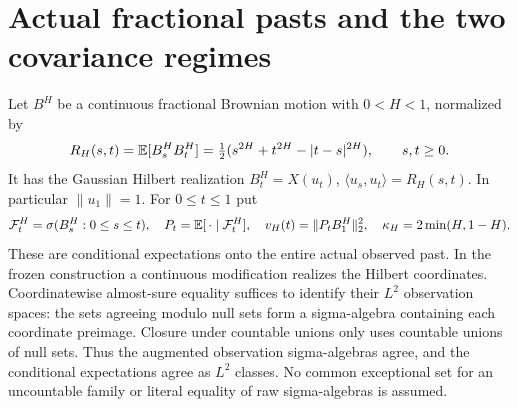 \documentclass[11pt]{article}
\begin{document}
\section{Actual fractional pasts and the two covariance regimes}
Let $B^H$ be a continuous fractional Brownian motion with $0<H<1$,
normalized by
\[
 R_H(s,t)=\mathbb E[B_s^HB_t^H]
 =\tfrac12(s^{2H}+t^{2H}-|t-s|^{2H}),\qquad s,t\geq0.
\]
It has the Gaussian Hilbert realization $B_t^H=X(u_t)$,
$\langle u_s,u_t\rangle=R_H(s,t)$. In particular $\|u_1\|=1$.
For $0\leq t\leq1$ put
\[
 \mathcal F_t^H=\sigma(B_s^H:0\leq s\leq t),\quad
 P_t=\mathbb E[\,\cdot\mid\mathcal F_t^H],\quad
 v_H(t)=\|P_tB_1^H\|_2^2,\quad \kappa_H=2\min(H,1-H).
\]
These are conditional expectations onto the entire actual observed
past. In the frozen construction a continuous modification realizes
the Hilbert coordinates. Coordinatewise almost-sure equality suffices
to identify their $L^2$ observation spaces: the sets agreeing modulo
null sets form a sigma-algebra containing each coordinate preimage.
Closure under countable unions only uses countable unions of null
sets. Thus the augmented observation sigma-algebras agree, and the
conditional expectations agree as $L^2$ classes. No common exceptional
set for an uncountable family or literal equality of raw sigma-algebras
is assumed.
\end{document}
